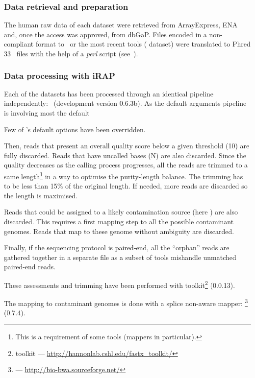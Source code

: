 \subsubsection{Data retrieval and preparation}

The human raw data of each dataset were retrieved from \gls{ArrayExpress},
\gls{ENA} and, once the access was approved, from \gls{dbGaP}.
Files encoded in a non-compliant format to \irap\ or the most recent
tools ( dataset)
were translated to \gls{Phred} $33$ \fastq\ files with the help of
a \emph{perl} script (see~).


\subsubsection{Data processing with iRAP}

Each of the datasets has been processed through an identical pipeline
independently: \irap\ (development version 0.6.3b). As the default arguments
pipeline is involving
most the default \irap\ 

Few of \irap's default options have been overridden. 


Then, reads that present an overall quality score below a given threshold (10) are
fully discarded. Reads that have uncalled bases (\textsc{N}) are also discarded.
Since the quality decreases as the calling process progresses, all the reads are
trimmed to a same length\footnote{This is a requirement of some tools (mappers
in particular).} in a way to optimise the purity-length balance. The trimming has
to be less than 15\% of the original length. If needed, more reads are discarded
so the length is maximised.

Reads that could be assigned to a likely contamination source (here
) are also discarded. This requires a first mapping
step to all the possible contaminant genomes. Reads that map to these genome
without ambiguity are discarded.

Finally, if the sequencing protocol is paired-end, all the ``orphan'' reads are
gathered together in a separate file as a subset of tools mishandle unmatched
paired-end reads.

These assessments and trimming have been performed with 
toolkit\footnote{ toolkit ---
\href{http://hannonlab.cshl.edu/fastx\_toolkit/}%
{http://hannonlab.cshl.edu/fastx\_toolkit/}} (0.0.13).

The mapping to contaminant genomes is done with a splice non-aware mapper:
\footnote{ --- \href{http://bio-bwa.sourceforge.net/}%
{http://bio-bwa.sourceforge.net/}} (0.7.4).

